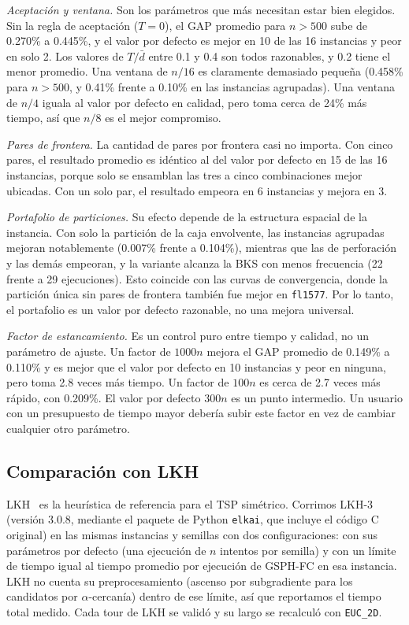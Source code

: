 \documentclass[runningheads]{llncs}
\begin{document}
\emph{Aceptación y ventana.} Son los parámetros que más necesitan estar
bien elegidos. Sin la regla de aceptación ($T=0$), el GAP promedio para
$n>500$ sube de 0.270\% a 0.445\%, y el valor por defecto es mejor en 10
de las 16 instancias y peor en solo 2. Los valores de $T/\bar d$ entre
0.1 y 0.4 son todos razonables, y 0.2 tiene el menor promedio. Una
ventana de $n/16$ es claramente demasiado pequeña (0.458\% para $n>500$,
y 0.41\% frente a 0.10\% en las instancias agrupadas). Una ventana de
$n/4$ iguala al valor por defecto en calidad, pero toma cerca de 24\% más
tiempo, así que $n/8$ es el mejor compromiso.

\emph{Pares de frontera.} La cantidad de pares por frontera casi no
importa. Con cinco pares, el resultado promedio es idéntico al del valor
por defecto en 15 de las 16 instancias, porque solo se ensamblan las tres
a cinco combinaciones mejor ubicadas. Con un solo par, el resultado
empeora en 6 instancias y mejora en 3.

\emph{Portafolio de particiones.} Su efecto depende de la estructura
espacial de la instancia. Con solo la partición de la caja envolvente,
las instancias agrupadas mejoran notablemente (0.007\% frente a 0.104\%),
mientras que las de perforación y las demás empeoran, y la variante
alcanza la BKS con menos frecuencia (22 frente a 29 ejecuciones). Esto
coincide con las curvas de convergencia, donde la partición única sin
pares de frontera también fue mejor en \texttt{fl1577}. Por lo tanto, el
portafolio es un valor por defecto razonable, no una mejora universal.

\emph{Factor de estancamiento.} Es un control puro entre tiempo y
calidad, no un parámetro de ajuste. Un factor de $1000n$ mejora el GAP
promedio de 0.149\% a 0.110\% y es mejor que el valor por defecto en 10
instancias y peor en ninguna, pero toma 2.8 veces más tiempo. Un factor
de $100n$ es cerca de 2.7 veces más rápido, con 0.209\%. El valor por
defecto $300n$ es un punto intermedio. Un usuario con un presupuesto de
tiempo mayor debería subir este factor en vez de cambiar cualquier otro
parámetro.

\subsection{Comparación con LKH}
\label{sec:lkh}

LKH~\cite{helsgaun2000effective,helsgaun2017extension} es la heurística
de referencia para el TSP simétrico. Corrimos LKH-3 (versión 3.0.8,
mediante el paquete de Python \texttt{elkai}, que incluye el código C
original) en las mismas instancias y semillas con dos configuraciones:
con sus parámetros por defecto (una ejecución de $n$ intentos por
semilla) y con un límite de tiempo igual al tiempo promedio por ejecución
de GSPH-FC en esa instancia. LKH no cuenta su preprocesamiento (ascenso
por subgradiente para los candidatos por $\alpha$-cercanía) dentro de ese
límite, así que reportamos el tiempo total medido. Cada tour de LKH se
validó y su largo se recalculó con \texttt{EUC\_2D}.
\end{document}
